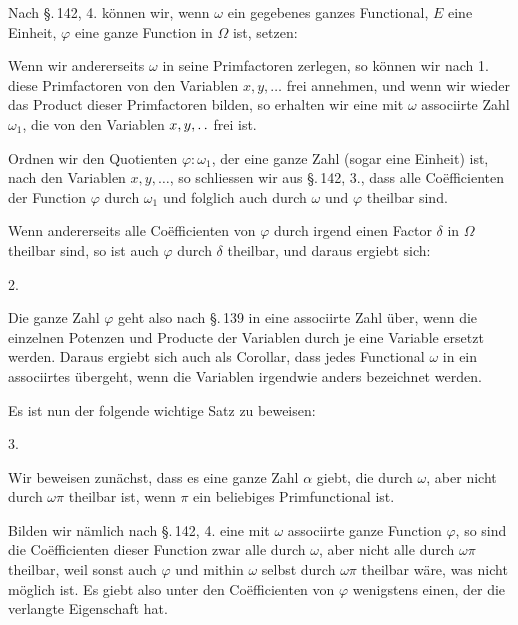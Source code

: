 
Nach \S.\,142, 4. k\"onnen wir, wenn $\omega$ ein gegebenes ganzes Functional, $E$ eine Einheit, $\varphi$ eine ganze Function in $\Omega$ ist, setzen:


Wenn wir andererseits $\omega$ in seine Primfactoren zerlegen, so k\"onnen wir nach 1. diese Primfactoren von den Variablen $x, y, \ldots$ frei annehmen, und wenn wir wieder das Product dieser Primfactoren bilden, so erhalten wir eine mit $\omega$ associirte Zahl $\omega_1$, die von den Variablen $x, y, \mathinner{.\,.}$ frei ist.

Ordnen wir den Quotienten $\varphi : \omega_1$, der eine ganze Zahl (sogar eine Einheit) ist, nach den Variablen $x, y, \ldots$, so schliessen wir aus \S.\,142, 3., dass alle Co\"efficienten der Function $\varphi$ durch $\omega_1$ und folglich auch durch $\omega$ und $\varphi$ theilbar sind.

Wenn andererseits alle Co\"efficienten von $\varphi$ durch irgend einen Factor $\delta$ in $\Omega$ theilbar sind, so ist auch $\varphi$ durch $\delta$ theilbar, und daraus ergiebt sich:

2. 

Die ganze Zahl $\varphi$ geht also nach \S.\,139 in eine associirte Zahl \"uber, wenn die einzelnen Potenzen und Producte der Variablen durch je eine Variable ersetzt werden. Daraus ergiebt sich auch als Corollar, dass jedes Functional $\omega$ in ein associirtes \"ubergeht, wenn die Variablen irgendwie anders bezeichnet werden.

Es ist nun der folgende wichtige Satz zu beweisen:

3. 

Wir beweisen zun\"achst, dass es eine ganze Zahl $\alpha$ giebt, die durch $\omega$, aber nicht durch $\omega\pi$ theilbar ist, wenn $\pi$ ein beliebiges Primfunctional ist.

Bilden wir n\"amlich nach \S.\,142, 4. eine mit $\omega$ associirte ganze Function $\varphi$, so sind die Co\"efficienten dieser Function zwar alle durch $\omega$, aber nicht alle durch $\omega\pi$ theilbar, weil sonst auch $\varphi$ und mithin $\omega$ selbst durch $\omega\pi$ theilbar w\"are, was nicht m\"oglich ist. Es giebt also unter den Co\"efficienten von $\varphi$ wenigstens einen, der die verlangte Eigenschaft hat.
